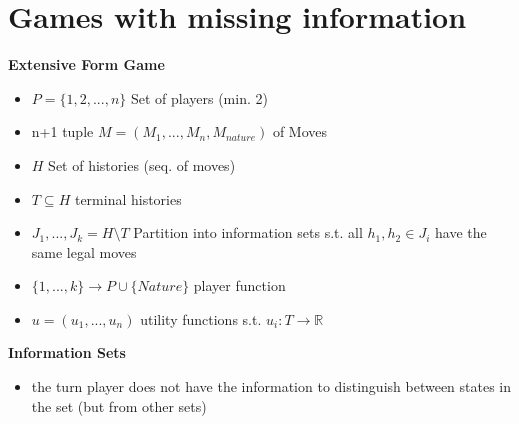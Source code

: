 \documentclass[12pt,a4paper]{article}
\newcommand{\ecb}[1]{\{#1\}}
\begin{document}
\section{Games with missing information}
\textbf{Extensive Form Game}
\begin{itemize}
\setlength\itemsep{0.05cm}
\item $P = \ecb{1,2,...,n}$ Set of players (min. 2)
\item n+1 tuple $M =(M_1,...,M_n,M_{nature})$ of Moves
\item $H$ Set of histories (seq. of moves)
\item $T\subseteq H$ terminal histories
\item $J_1,...,J_k = H\setminus T$ Partition into information sets s.t. all $h_1, h_2 \in J_i$ have the same legal moves
\item $\ecb{1,...,k} \rightarrow P \cup \ecb{Nature}$ player function
\item $u = (u_1,...,u_n)$ utility functions s.t. $u_i : T \rightarrow \mathbb{R}$
\end{itemize}
\textbf{Information Sets}
\begin{itemize}
\setlength\itemsep{0.05cm}
\item the turn player does not have the information to distinguish between states in the set (but from other sets)

\end{itemize}
\end{document}
